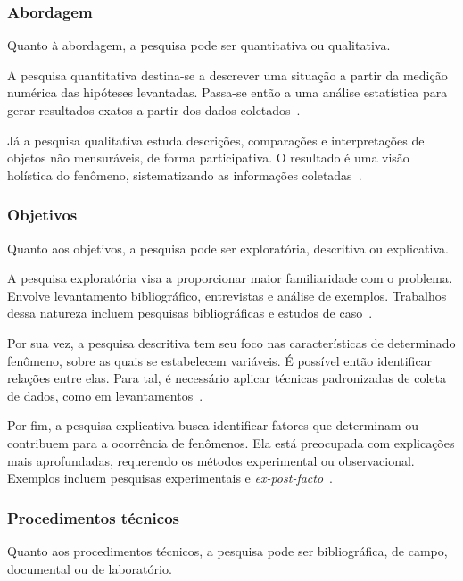 \subsubsection{Abordagem}

Quanto à abordagem, a pesquisa pode ser quantitativa ou qualitativa.

A pesquisa quantitativa destina-se a descrever uma situação a partir da medição numérica das hipóteses levantadas.
Passa-se então a uma análise estatística para gerar resultados exatos a partir dos dados coletados~\cite{liamara_pesquisa}.

Já a pesquisa qualitativa estuda descrições, comparações e interpretações de objetos não mensuráveis, de forma participativa.
O resultado é uma visão holística do fenômeno, sistematizando as informações coletadas~\cite{liamara_pesquisa}.

\subsubsection{Objetivos}

Quanto aos objetivos, a pesquisa pode ser exploratória, descritiva ou explicativa.

A pesquisa exploratória visa a proporcionar maior familiaridade com o problema.
Envolve levantamento bibliográfico, entrevistas e análise de exemplos.
Trabalhos dessa natureza incluem pesquisas bibliográficas e estudos de caso~\cite{liamara_pesquisa}.

Por sua vez, a pesquisa descritiva tem seu foco nas características de determinado fenômeno, sobre as quais se estabelecem variáveis.
É possível então identificar relações entre elas.
Para tal, é necessário aplicar técnicas padronizadas de coleta de dados, como em levantamentos~\cite{liamara_pesquisa}.

Por fim, a pesquisa explicativa busca identificar fatores que determinam ou contribuem para a ocorrência de fenômenos.
Ela está preocupada com explicações mais aprofundadas, requerendo os métodos experimental ou observacional.
Exemplos incluem pesquisas experimentais e \textit{ex-post-facto}~\cite{liamara_pesquisa}.

\subsubsection{Procedimentos técnicos}

Quanto aos procedimentos técnicos, a pesquisa pode ser bibliográfica, de campo, documental ou de laboratório.

